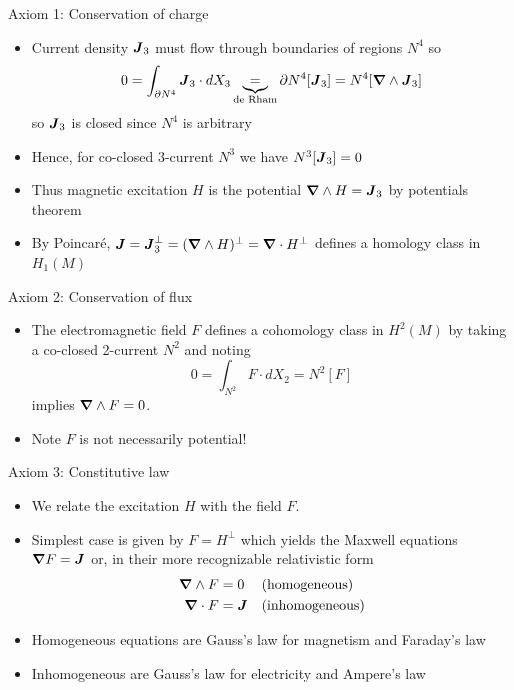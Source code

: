 \documentclass[aspectratio=169]{beamer}
\begin{document}
\begin{frame}{Axiom 1: Conservation of charge}
\vfill   
    \begin{itemize}
    \item Current density $\boldsymbol{J}_3$ must flow through boundaries of regions $N^4$ so
    \[
    0=\int_{\partial N^4} \boldsymbol{J}_3 \cdot dX_3 \underbrace{=}_{\textrm{de Rham}} {\partial N^4}[ \boldsymbol{J}_3]={N^4}[\boldsymbol{\nabla} \wedge \boldsymbol{J}_3]
    \]
    so $\boldsymbol{J}_3$ is closed since $N^4$ is arbitrary
    \item Hence, for co-closed 3-current $N^3$ we have ${N^3}[\boldsymbol{J}_3]=0$
    \item Thus magnetic excitation $H$ is the potential $\boldsymbol{\nabla} \wedge H=\boldsymbol{J}_3$ by potentials theorem
    \item By Poincar\'e, $\boldsymbol{J}=\boldsymbol{J}_3^\perp = (\boldsymbol{\nabla} \wedge H)^\perp = \boldsymbol{\nabla} \cdot H^\perp$ defines a homology class in $H_1(M)$
\end{itemize}
\vfill
\end{frame}

\begin{frame}{Axiom 2: Conservation of flux}
\vfill
\begin{itemize}
	\item The electromagnetic field $F$ defines a cohomology class in $H^2(M)$ by taking a co-closed 2-current $N^2$ and noting
	    \[
	    0=\int_{N^2} F \cdot dX_2 = N^2[F] 
	    \]
	    implies $\boldsymbol{\nabla} \wedge F=0$.
	    \item Note $F$ is not necessarily potential!
\end{itemize}
\vfill
\end{frame}

\begin{frame}{Axiom 3: Constitutive law}
\vfill
    \begin{itemize}
    \item  We relate the excitation $H$ with the field $F$. 
    \item Simplest case is given by $F=H^\perp$ which yields the Maxwell equations $\boldsymbol{\nabla} F = \boldsymbol{J}$ or, in their more recognizable relativistic form
    \begin{align*}
        \boldsymbol{\nabla} \wedge F &= 0 && \textrm{(homogeneous)}\\
        \boldsymbol{\nabla} \cdot F &= \boldsymbol{J} && \textrm{(inhomogeneous)}
    \end{align*}
    \item Homogeneous equations are Gauss's law for magnetism and Faraday's law
    \item Inhomogeneous are Gauss's law for electricity and Ampere's law
\end{itemize}
\vfill
\end{frame}
\end{document}
